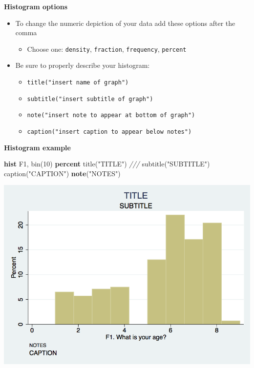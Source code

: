 \documentclass[
]{book}
\newenvironment{Shaded}{\begin{snugshade}}{\end{snugshade}}
\newcommand{\BaseNTok}[1]{\textcolor[rgb]{0.00,0.00,0.81}{#1}}
\newcommand{\CommentTok}[1]{\textcolor[rgb]{0.56,0.35,0.01}{\textit{#1}}}
\newcommand{\KeywordTok}[1]{\textcolor[rgb]{0.13,0.29,0.53}{\textbf{#1}}}
\newcommand{\NormalTok}[1]{#1}
\newcommand{\StringTok}[1]{\textcolor[rgb]{0.31,0.60,0.02}{#1}}
\providecommand{\tightlist}{%
  \setlength{\itemsep}{0pt}\setlength{\parskip}{0pt}}
\begin{document}
\textbf{Histogram options}

\begin{itemize}
\tightlist
\item
  To change the numeric depiction of your data add these options after the comma

  \begin{itemize}
  \tightlist
  \item
    Choose one: \texttt{density}, \texttt{fraction}, \texttt{frequency}, \texttt{percent}
  \end{itemize}
\item
  Be sure to properly describe your histogram:

  \begin{itemize}
  \tightlist
  \item
    \texttt{title("insert\ name\ of\ graph")}
  \item
    \texttt{subtitle("insert\ subtitle\ of\ graph")}
  \item
    \texttt{note("insert\ note\ to\ appear\ at\ bottom\ of\ graph")}
  \item
    \texttt{caption("insert\ caption\ to\ appear\ below\ notes")}
  \end{itemize}
\end{itemize}

\textbf{Histogram example}

\begin{Shaded}
\begin{Highlighting}[]
\KeywordTok{hist}\NormalTok{ F1, }\BaseNTok{bin}\NormalTok{(10) }\KeywordTok{percent} \BaseNTok{title}\NormalTok{(}\StringTok{"TITLE"}\NormalTok{) }\CommentTok{///}
  \BaseNTok{subtitle}\NormalTok{(}\StringTok{"SUBTITLE"}\NormalTok{) }\BaseNTok{caption}\NormalTok{(}\StringTok{"CAPTION"}\NormalTok{) }\KeywordTok{note}\NormalTok{(}\StringTok{"NOTES"}\NormalTok{)}
\end{Highlighting}
\end{Shaded}

\includegraphics{Stata/StataGraphics/images/hist1.png}
\end{document}
